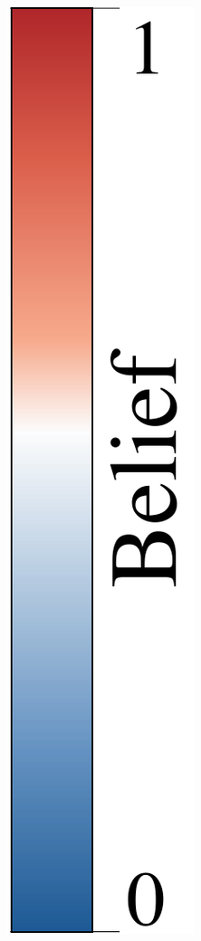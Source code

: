 \documentclass[runningheads]{llncs}%
\begin{document}
\begin{figure}
\begin{subfigure}{.03\linewidth}
        {\includegraphics[width=\linewidth]{figs/cbar/cbar_belief.pdf}}     

\end{subfigure}
\end{figure}
\end{document}
